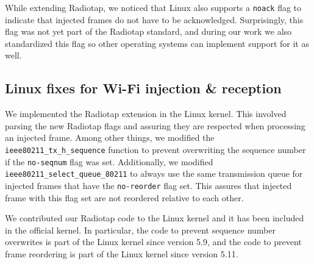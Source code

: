 \documentclass[sigconf]{acmart}
\newcommand{\wifi}{\mbox{Wi-Fi}}
\newcommand{\red}[1]{\textcolor{red}{#1}}
\begin{document}
While extending Radiotap, we noticed that Linux also supports a \verb|noack| flag to indicate that injected frames do not have to be acknowledged.
Surprisingly, this flag was not yet part of the Radiotap standard, and during our work we also standardized this flag so other operating systems can implement support for it as well.


\subsection{Linux fixes for \wifi{} injection \& reception}
\label{sec:improvedinjection:linux}

We implemented the Radiotap extension in the Linux kernel.
This involved parsing the new Radiotap flags and assuring they are respected when processing an injected frame.
Among other things, we modified the \verb|ieee80211_tx_h_sequence| function to prevent overwriting the sequence number if the \verb|no-seqnum| flag was set.
Additionally, we modified \verb|ieee80211_select_queue_80211| to always use the same transmission queue for injected frames that have the \verb|no-reorder| flag set.
This assures that injected frame with this flag set are not reordered relative to each other.

We contributed our Radiotap code to the Linux kernel and it has been included in the official kernel.
In particular, the code to prevent sequence number overwrites is  part of the Linux kernel since version 5.9, and the code to prevent frame reordering is part of the Linux kernel since version 5.11.

%
%
%
\end{document}
